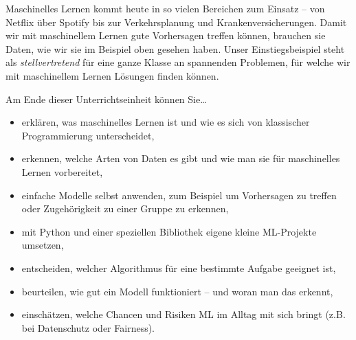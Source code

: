 \begin{lpu}
Maschinelles Lernen kommt heute in so vielen Bereichen zum Einsatz – von Netflix über Spotify bis zur Verkehrsplanung und Krankenversicherungen. Damit wir mit maschinellem Lernen gute Vorhersagen treffen können, brauchen sie Daten, wie wir sie im Beispiel oben gesehen haben. Unser Einstiegsbeispiel steht als \textit{stellvertretend} für eine ganze Klasse an spannenden Problemen, für welche wir mit maschinellem Lernen Lösungen finden können.

\newpage

Am Ende dieser Unterrichtseinheit können Sie…

\begin{itemize}
  \item erklären, was maschinelles Lernen ist und wie es sich von klassischer Programmierung unterscheidet,
  \item erkennen, welche Arten von Daten es gibt und wie man sie für maschinelles Lernen vorbereitet,
  \item einfache Modelle selbst anwenden, zum Beispiel um Vorhersagen zu treffen oder Zugehörigkeit zu einer Gruppe zu erkennen,
  \item mit Python und einer speziellen Bibliothek eigene kleine ML-Projekte umsetzen,
  \item entscheiden, welcher Algorithmus für eine bestimmte Aufgabe geeignet ist,
  \item beurteilen, wie gut ein Modell funktioniert – und woran man das erkennt,
  \item einschätzen, welche Chancen und Risiken ML im Alltag mit sich bringt (z.B. bei Datenschutz oder Fairness).
\end{itemize}
    
\end{lpu}